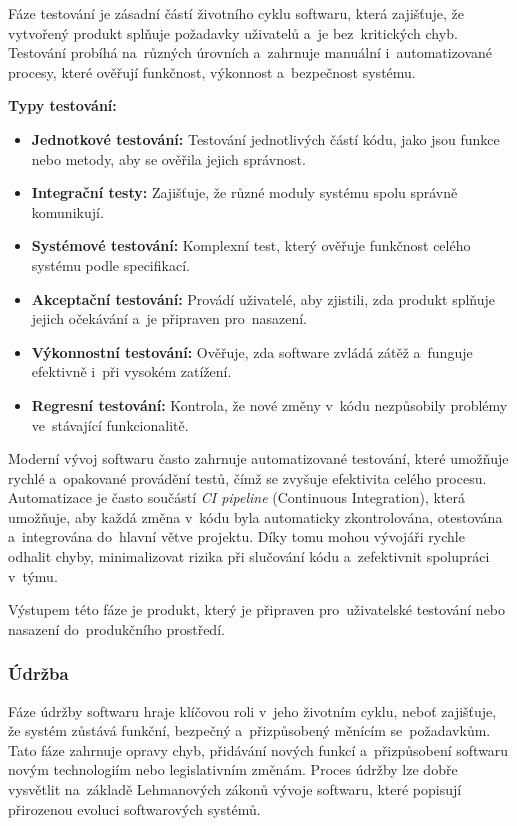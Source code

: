 \documentclass[male,czech,api_bc]{kitheses}
\begin{document}
Fáze testování je zásadní částí životního cyklu softwaru, která zajišťuje, že vytvořený produkt splňuje požadavky uživatelů a~je bez~kritických chyb. Testování probíhá na~různých úrovních a~zahrnuje manuální i~automatizované procesy, které ověřují funkčnost, výkonnost a~bezpečnost systému.

\textbf{Typy testování:}
\begin{itemize}
	\item \textbf{Jednotkové testování:} Testování jednotlivých částí kódu, jako jsou funkce nebo metody, aby se ověřila jejich správnost.
	\item \textbf{Integrační testy:} Zajišťuje, že různé moduly systému spolu správně komunikují.
	\item \textbf{Systémové testování:} Komplexní test, který ověřuje funkčnost celého systému podle specifikací.
	\item \textbf{Akceptační testování:} Provádí uživatelé, aby zjistili, zda produkt splňuje jejich očekávání a~je připraven pro~nasazení.
	\item \textbf{Výkonnostní testování:} Ověřuje, zda software zvládá zátěž a~funguje efektivně i~při vysokém zatížení.
	\item \textbf{Regresní testování:} Kontrola, že nové změny v~kódu nezpůsobily problémy ve~stávající funkcionalitě.
\end{itemize}

Moderní vývoj softwaru často zahrnuje automatizované testování, které umožňuje rychlé a~opakované provádění testů, čímž se zvyšuje efektivita celého procesu. Automatizace je často součástí \textit{CI pipeline} (Continuous Integration), která umožňuje, aby každá změna v~kódu byla automaticky zkontrolována, otestována a~integrována do~hlavní větve projektu. Díky tomu mohou vývojáři rychle odhalit chyby, minimalizovat rizika při slučování kódu a~zefektivnit spolupráci v~týmu.

Výstupem této fáze je produkt, který je připraven pro~uživatelské testování nebo nasazení do~produkčního prostředí.

\subsubsection{Údržba}

Fáze údržby softwaru hraje klíčovou roli v~jeho životním cyklu, neboť zajišťuje, že systém zůstává funkční, bezpečný a~přizpůsobený měnícím se~požadavkům. Tato fáze zahrnuje opravy chyb, přidávání nových funkcí a~přizpůsobení softwaru novým technologiím nebo legislativním změnám. Proces údržby lze dobře vysvětlit na~základě Lehmanových zákonů vývoje softwaru, které popisují přirozenou evoluci softwarových systémů.
\end{document}
